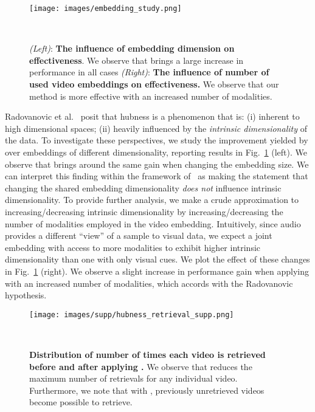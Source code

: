 \begin{figure}
    \centering
    \texttt{[image: images/embedding\_study.png]}
    \caption{
    \textit{(Left)}:
    \textbf{The influence of embedding dimension on \methodName effectiveness}.
    We observe that \methodName brings a large increase in performance in all cases
    \textit{(Right)}:
    \textbf{The influence of number of used video embeddings on \methodName effectiveness.}
    We observe that our method is more effective with an increased number of modalities.
    }
    \mbox{}\vspace{-0.7cm} \\
    \label{fig:embedding-size}
\end{figure}

Radovanovic et al.~\cite{radovanovic2010hubs} posit that hubness
is a phenomenon that is:
(i) inherent to high dimensional spaces;
(ii) heavily influenced by the
\textit{intrinsic dimensionality} of the data.
To investigate these perspectives, we study the improvement
yielded by \methodName over embeddings of different dimensionality,
reporting results in Fig.~\ref{fig:embedding-size} (left).
We observe that \methodName brings around the same gain
when changing the embedding size.
We can interpret this finding within the framework
of~\cite{radovanovic2010hubs} as making the statement
that changing the shared embedding dimensionality
\textit{does not} influence intrinsic dimensionality.
To provide further analysis, 
we make a crude approximation to increasing/decreasing
intrinsic dimensionality by increasing/decreasing the
number of modalities employed in the video embedding.
Intuitively, since audio provides a different ``view'' of a sample
to visual data,
we expect a joint embedding with access to more modalities
to exhibit higher intrinsic dimensionality than one with only visual
cues.
We plot the effect of these changes
in Fig.~\ref{fig:embedding-size} (right).
We observe a slight increase in performance gain when
applying \methodName with an increased number of modalities,
which accords with the Radovanovic~\cite{radovanovic2010hubs} hypothesis.

\begin{figure*}
    \centering
    \texttt{[image: images/supp/hubness\_retrieval\_supp.png]}
    \vspace{-0.3cm}
    \caption{\textbf{Distribution of number of times each video is retrieved before and after applying \methodName.} We observe that \methodName reduces the maximum number of retrievals for any individual video. Furthermore, we note that with \methodName, previously unretrieved videos become possible to retrieve.}
    \mbox{}\vspace{-0.7cm} \\
    \label{fig:hubness-before-after}
\end{figure*}

